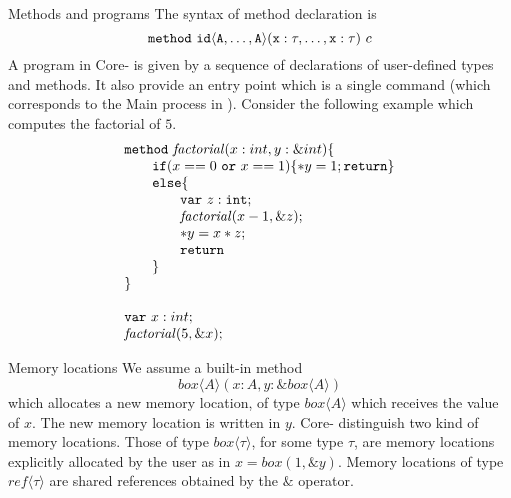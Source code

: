 \documentclass[12pt]{article}
\def\sail{{\sc{sail}}}
\begin{document}
\begin{paragraph}{Methods and programs}
The syntax of method declaration is 
$$
{\tt{method~id\langle A,\ldots,A \rangle(x:\tau,\ldots,x:\tau)}}~c
$$
A program in Core-\sail{} is given by a sequence of declarations of user-defined types and methods. It also provide an entry 
point which is a single command (which corresponds to the Main process in \sail{}). Consider the following example which computes 
the factorial of $5$.
$$
\begin{array}{l}
{\tt{method}}~{\mathit{factorial}}(x : int, y:\&int) \{\\
    \qquad {\tt{if}} (x==0~{\tt{or}}~x==1 ) \{*y = 1; {\tt{return}}\}\\
    \qquad{\tt{else}} \{\\
    \qquad\qquad  {\tt{var}}~z : {\tt{int}};\\
    \qquad\qquad  {\mathit{factorial}}(x - 1, \&z);\\
    \qquad\qquad  *y = x * z;\\
    \qquad\qquad  {\tt{return}}\\
    \qquad\}\\
\}
\\\\

{\tt{var}}~x : int;\\
{\mathit{factorial}} (5, \&x);\\

\end{array}
$$
\end{paragraph}

\begin{paragraph}{Memory locations}
We assume a built-in method 
$$box\langle A\rangle (x:A, y:\&box\langle A\rangle)$$
 which allocates a new memory location, of type $box\langle A\rangle$ 
which receives the value of $x$. The new memory location is written in $y$. Core-\sail{} distinguish two kind of 
memory locations. Those of type $box\langle\tau\rangle$, for some type $\tau$, are memory locations explicitly allocated 
by the user as in $x = box(1,\&y)$. Memory locations of type $ref\langle\tau\rangle$ are shared references obtained by 
the $\&$ operator.
\end{paragraph}
\end{document}
